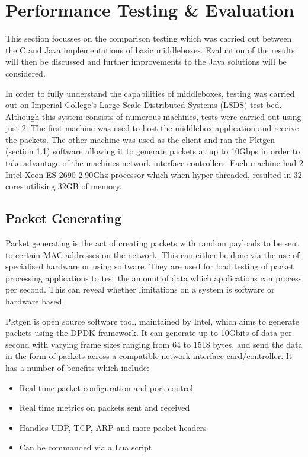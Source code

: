 \documentclass[final_report.tex]{subfiles}
\begin{document}
\section{Performance Testing \& Evaluation}
\label{sec:evaluation}

This section focusses on the comparison testing which was carried out between the C and Java implementations of basic middleboxes. Evaluation of the results will then be discussed and further improvements to the Java solutions will be considered.

In order to fully understand the capabilities of middleboxes, testing was carried out on Imperial College's Large Scale Distributed Systems (LSDS) test-bed. Although this system consists of numerous machines, tests were carried out using just 2. The first machine was used to host the middlebox application and receive the packets. The other machine was used as the client and ran the Pktgen (section \ref{subsec:pktgen}) software allowing it to generate packets at up to 10Gbps in order to take advantage of the machines network interface controllers. Each machine had 2 Intel Xeon ES-2690 2.90Ghz processor which when hyper-threaded, resulted in 32 cores utilising 32GB of memory.

\subsection{Packet Generating}
\label{subsec:pktgen}
Packet generating is the act of creating packets with random payloads to be sent to certain MAC addresses on the network. This can either be done via the use of specialised hardware or using software. They are used for load testing of packet processing applications to test the amount of data which applications can process per second. This can reveal whether limitations on a system is software or hardware based.

Pktgen is open source software tool, maintained by Intel, which aims to generate packets using the DPDK framework. It can generate up to 10Gbits of data per second with varying frame sizes ranging from 64 to 1518 bytes, and send the data in the form of packets across a compatible network interface card/controller. It has a number of benefits which include:

\begin{itemize}
	\item Real time packet configuration and port control
	\item Real time metrics on packets sent and received
	\item Handles UDP, TCP, ARP and more packet headers
	\item Can be commanded via a Lua script
\end{itemize}
\end{document}
